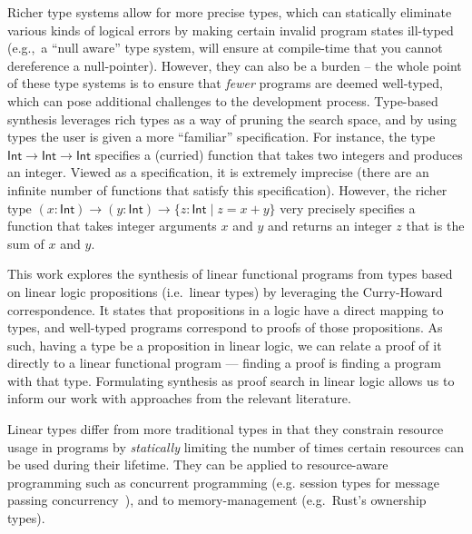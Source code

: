 \documentclass{llncs}
\newcommand{\mypara}[1]{\paragraph{\textbf{#1}.}}
\begin{document}
Richer type systems allow for more precise types, which can
statically eliminate various kinds of logical errors by making certain
invalid program states ill-typed (e.g.,~a ``null aware'' type system,
will ensure at compile-time that you cannot dereference a
null-pointer). However, they can also be a burden -- the whole point
of these type systems is to ensure that \emph{fewer} programs are
deemed well-typed, which can pose additional challenges to the
development process. Type-based synthesis leverages rich types as a
way of pruning the search space, and by using types the user 
is given a more ``familiar'' specification. For instance, the type
$\mathsf{Int} \rightarrow \mathsf{Int} \rightarrow \mathsf{Int}$
specifies a (curried) function that takes two integers and produces an
integer. Viewed as a specification, it is extremely imprecise (there
are an infinite number of functions that satisfy this specification).
However, the richer type $(x{:}\mathsf{Int}) \rightarrow
(y{:}\mathsf{Int}) \rightarrow \{z{:}\mathsf{Int} \mid z = x+y\}$
very precisely specifies a function that takes integer arguments $x$
and $y$ and returns an integer $z$ that is the sum of $x$ and $y$. 

%
This work explores the synthesis of linear functional
programs from types based on linear logic propositions (i.e.~linear
types) by leveraging the Curry-Howard correspondence. It
states that propositions in a logic have a direct
mapping to types, and well-typed programs correspond to proofs of
those propositions.  As such, having a type be a proposition in linear
logic, we can relate a proof of it directly to a linear
functional program — finding a proof is finding a program with that
type. Formulating synthesis as proof search in linear logic
allows us to inform our work with approaches from the relevant 
literature.

Linear types differ from more traditional types in
that they constrain resource usage in programs by \emph{statically}
limiting the number of times certain resources can be used during
their lifetime.  They can be applied to resource-aware programming
such as concurrent programming (e.g. session types for message passing
concurrency~\cite{DBLP:journals/mscs/CairesPT16}), and to memory-management (e.g.~Rust's ownership
types).

\end{document}
